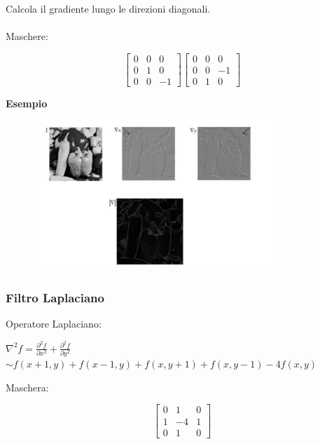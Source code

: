 Calcola il gradiente lungo le direzioni diagonali.
\\\\
Maschere:

\begin{center}
    \[
        \begin{bmatrix}
            0 & 0 & 0  \\
            0 & 1 & 0  \\
            0 & 0 & -1
        \end{bmatrix}
        \begin{bmatrix}
            0 & 0 & 0  \\
            0 & 0 & -1 \\
            0 & 1 & 0
        \end{bmatrix}
    \]
\end{center}

\textbf{Esempio}

\begin{figure}[H]
    \centering
    \includegraphics[width=\linewidth, keepaspectratio]{capitoli/immagini/imgs/roberts.png}
\end{figure}

\newpage
\subsubsection{Filtro Laplaciano}

Operatore Laplaciano:

\begin{center}
    $\nabla^2 f = \frac{\partial^2{f}}{\partial{x^2}} + \frac{\partial^2{f}}{\partial{y^2}}$
    \\$\sim f(x+1,y)+f(x-1,y)+f(x,y+1)+f(x,y-1)-4f(x,y)$
\end{center}
Maschera:
\begin{center}
    \[
        \begin{bmatrix}
            0 & 1  & 0 \\
            1 & -4 & 1 \\
            0 & 1  & 0
        \end{bmatrix}
    \]
\end{center}

